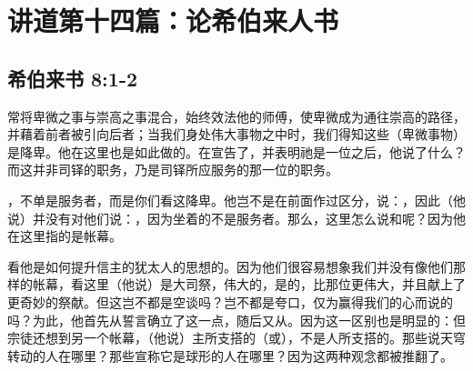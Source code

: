 

\section{讲道第十四篇：论希伯来人书}


\subsection{希伯来书 8:1-2}

\par

常将卑微之事与崇高之事混合，始终效法他的师傅，使卑微成为通往崇高的路径，并藉着前者被引向后者；当我们身处伟大事物之中时，我们得知这些（卑微事物）是降卑。他在这里也是如此做的。在宣告了，并表明祂是一位之后，他说了什么？而这并非司铎的职务，乃是司铎所应服务的那一位的职务。\par

，不单是服务者，而是你们看这降卑。他岂不是在前面作过区分，说：，因此（他说）并没有对他们说：，因为坐着的不是服务者。那么，这里怎么说和呢？因为他在这里指的是帐幕。\par

看他是如何提升信主的犹太人的思想的。因为他们很容易想象我们并没有像他们那样的帐幕，看这里（他说）是大司祭，伟大的，是的，比那位更伟大，并且献上了更奇妙的祭献。但这岂不都是空谈吗？岂不都是夸口，仅为赢得我们的心而说的吗？为此，他首先从誓言确立了这一点，随后又从。因为这一区别也是明显的：但宗徒还想到另一个帐幕，（他说）主所支搭的（或），不是人所支搭的。那些说天穹转动的人在哪里？那些宣称它是球形的人在哪里？因为这两种观念都被推翻了。\par

